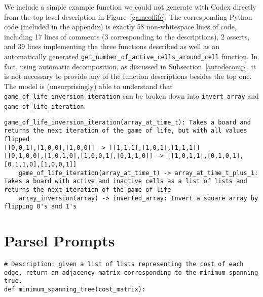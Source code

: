 We include a simple example function we could not generate with Codex \citep{chen2021evaluating} directly from the top-level description in Figure~\ref{gameoflife}.  The corresponding Python code (included in the appendix) is exactly 58 non-whitespace lines of code, including 17 lines of comments (3 corresponding to the descriptions), 2 asserts, and 39 lines implementing the three functions described as well as an automatically generated \lstinline{get_number_of_active_cells_around_cell} function. In fact, using automatic decomposition, as discussed in Subsection~\ref{autodecomp}, it is not necessary to provide any of the function descriptions besides the top one. The model is (unsurprisingly) able to understand that \lstinline{game_of_life_inversion_iteration} can be broken down into \lstinline{invert_array} and \lstinline{game_of_life_iteration}.

\begin{figure*}[h]
\begin{lstlisting}
game_of_life_inversion_iteration(array_at_time_t): Takes a board and returns the next iteration of the game of life, but with all values flipped
[[0,0,1],[1,0,0],[1,0,0]] -> [[1,1,1],[1,0,1],[1,1,1]]
[[0,1,0,0],[1,0,1,0],[1,0,0,1],[0,1,1,0]] -> [[1,0,1,1],[0,1,0,1],[0,1,1,0],[1,0,0,1]]
    game_of_life_iteration(array_at_time_t) -> array_at_time_t_plus_1: Takes a board with active and inactive cells as a list of lists and returns the next iteration of the game of life
    array_inversion(array) -> inverted_array: Invert a square array by flipping 0's and 1's
\end{lstlisting}
\vspace{-8px}
\caption{An example Parsel program for Python that takes in a list of lists representing a state of Conway's game of life \citep{games1970fantastic} and returns the next state, with all the values inverted.}
\label{gameoflife}
\vspace{-12px}
\end{figure*}

\section{Parsel Prompts}
\label{parselprompts}

\begin{figure*}[h]
\begin{lstlisting}
# Description: given a list of lists representing the cost of each edge, return an adjacency matrix corresponding to the minimum spanning true.
def minimum_spanning_tree(cost_matrix):
\end{lstlisting}
\caption{Codex Prompt for an example leaf node}
\end{figure*}

